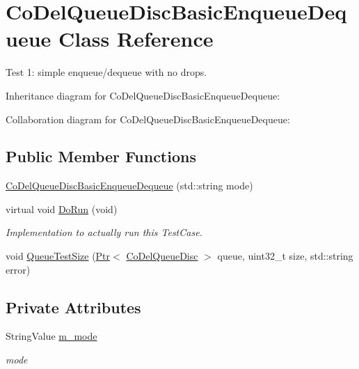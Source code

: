 \hypertarget{classCoDelQueueDiscBasicEnqueueDequeue}{}\section{Co\+Del\+Queue\+Disc\+Basic\+Enqueue\+Dequeue Class Reference}
\label{classCoDelQueueDiscBasicEnqueueDequeue}


Test 1\+: simple enqueue/dequeue with no drops.  




Inheritance diagram for Co\+Del\+Queue\+Disc\+Basic\+Enqueue\+Dequeue\+:


Collaboration diagram for Co\+Del\+Queue\+Disc\+Basic\+Enqueue\+Dequeue\+:
\subsection*{Public Member Functions}
\begin{DoxyCompactItemize}
\item 
\hyperlink{classCoDelQueueDiscBasicEnqueueDequeue_a77f6d23bf0d9510ec53444f9d121b8b2}{Co\+Del\+Queue\+Disc\+Basic\+Enqueue\+Dequeue} (std\+::string mode)
\item 
virtual void \hyperlink{classCoDelQueueDiscBasicEnqueueDequeue_a4bfd4d8f3da3c1cca119abd359d5f590}{Do\+Run} (void)
\begin{DoxyCompactList}\small\item\em Implementation to actually run this Test\+Case. \end{DoxyCompactList}\item 
void \hyperlink{classCoDelQueueDiscBasicEnqueueDequeue_abd4b321f709f67998f635c2f6567b993}{Queue\+Test\+Size} (\hyperlink{classns3_1_1Ptr}{Ptr}$<$ \hyperlink{classns3_1_1CoDelQueueDisc}{Co\+Del\+Queue\+Disc} $>$ queue, uint32\+\_\+t size, std\+::string error)
\end{DoxyCompactItemize}
\subsection*{Private Attributes}
\begin{DoxyCompactItemize}
\item 
String\+Value \hyperlink{classCoDelQueueDiscBasicEnqueueDequeue_a8fbc5f104a809347a06d9103b996170d}{m\+\_\+mode}
\begin{DoxyCompactList}\small\item\em mode \end{DoxyCompactList}\end{DoxyCompactItemize}
